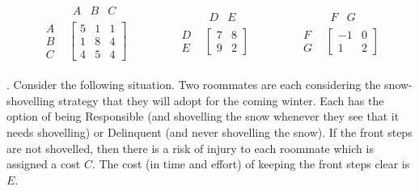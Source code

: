 \documentclass[reqno,12pt]{amsart}
\begin{document}
\noindent
$$
\begin{matrix}
\begin{matrix}
& \begin{matrix} A & B & C \end{matrix}       \\
\begin{matrix} A \\ B \\ C \end{matrix}         &
\begin{bmatrix}
5 & 1 & 1       \\
1 & 8 & 4       \\
4 & 5 & 4
\end{bmatrix}
\end{matrix}
& \qquad &
\begin{matrix}
& \begin{matrix} D & E \end{matrix}   \\
\begin{matrix} D \\ E \end{matrix}              &
\begin{bmatrix}
7 & 8   \\
9 & 2
\end{bmatrix}
\end{matrix}
& \qquad &
\begin{matrix}
& \begin{matrix} F & G \end{matrix}   \\
\begin{matrix} F \\ G \end{matrix}              &
\begin{bmatrix}
-1 & 0   \\
1 & 2
\end{bmatrix}
\end{matrix}
\end{matrix}
$$

\vspace{3cm}

.  Consider the following situation.  Two roommates are each
considering the snow-shovelling strategy that they will adopt
for the coming winter.  Each has the option of being Responsible
(and shovelling the snow whenever they see that it needs shovelling)
or Delinquent (and never shovelling the snow).  If the front steps
are not shovelled, then there is a risk of injury to each roommate
which is assigned a cost $C$.  The cost (in time and effort) of
keeping the front steps clear is $E$.
\end{document}
